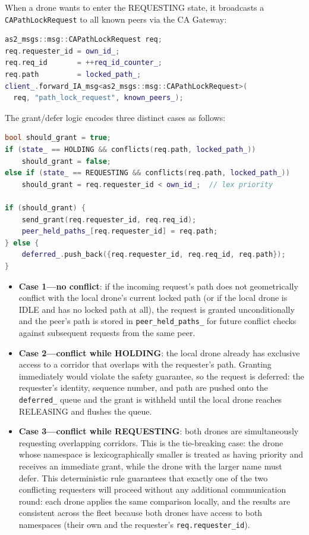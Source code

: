 \documentclass[deliverable]{csreport}
\renewcommand{\code}[1]{\texttt{\textcolor{CSMaroon}{#1}}}%
\begin{document}
When a drone wants to enter the REQUESTING state, it broadcasts a \code{CAPathLockRequest} to all known peers via the CA Gateway:

\begin{lstlisting}[language=C++, style=cppcolors,caption={Broadcasting a path lock request}]
as2_msgs::msg::CAPathLockRequest req;
req.requester_id = own_id_;
req.req_id       = ++req_id_counter_;
req.path         = locked_path_;
client_.forward_IA_msg<as2_msgs::msg::CAPathLockRequest>(
  req, "path_lock_request", known_peers_);
\end{lstlisting}

The grant/defer logic encodes three distinct cases as follows:

\begin{lstlisting}[language=C++, style=cppcolors,caption={Granting or deferring an incoming lock request}]
bool should_grant = true;
if (state_ == HOLDING && conflicts(req.path, locked_path_))
    should_grant = false;
else if (state_ == REQUESTING && conflicts(req.path, locked_path_))
    should_grant = req.requester_id < own_id_;  // lex priority

if (should_grant) {
    send_grant(req.requester_id, req.req_id);
    peer_held_paths_[req.requester_id] = req.path;
} else {
    deferred_.push_back({req.requester_id, req.req_id, req.path});
}
\end{lstlisting}

\begin{itemize}
    \item \textbf{Case 1---no conflict}: if the incoming request's path does not geometrically conflict with the local drone's current locked path (or if the local drone is IDLE and has no locked path at all), the request is granted unconditionally and the peer's path is stored in \code{peer\_held\_paths\_} for future conflict checks against subsequent requests from the same peer.
    \item  \textbf{Case 2---conflict while HOLDING}: the local drone already has exclusive access to a corridor that overlaps with the requester's path. Granting immediately would violate the safety guarantee, so the request is deferred: the requester's identity, sequence number, and path are pushed onto the \code{deferred\_} queue and the grant is withheld until the local drone reaches RELEASING and flushes the queue. 
    \item \textbf{Case 3---conflict while REQUESTING}: both drones are simultaneously requesting overlapping corridors. This is the tie-breaking case: the drone whose namespace is lexicographically smaller is treated as having priority and receives an immediate grant, while the drone with the larger name must defer. This deterministic rule guarantees that exactly one of the two conflicting requesters will proceed without any additional communication round: each drone applies the same comparison locally, and the results are consistent across the fleet because both drones have access to both namespaces (their own and the requester's \code{req.requester\_id}).
\end{itemize}
\end{document}
